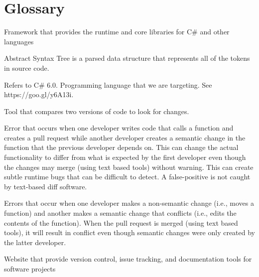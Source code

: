 \documentclass[draftclsnofoot,onecolumn]{IEEEtran}
\begin{document}
\section{Glossary}%

\begin{description} 

\item[.NET:] Framework that provides the runtime and core libraries for C\# 
and other languages

\item[AST:] Abstract Syntax Tree is a parsed data structure that represents 
all of the tokens in source code.

\item[C\#:] Refers to C\# 6.0. Programming language that we are targeting. 
See https://goo.gl/y6A13i.

\item[Diff:] Tool that compares two versions of code to look for changes.

\item[False-Positive:] Error that occurs when one developer writes code that 
calls a function and creates a pull request while another developer creates a 
semantic change in the function that the previous developer depends on. This 
can change the actual functionality to differ from what is expected by the 
first developer even though the changes may merge (using text based tools) 
without warning. This can create subtle runtime bugs that can be difficult to 
detect. A false-positive is not caught by text-based diff software.

\item[False-Negative:] Errors that occur when one developer makes a 
non-semantic change (i.e., moves a function) and another makes a semantic 
change that conflicts (i.e., edits the contents of the function). When the 
pull request is merged (using text based tools), it will result in conflict 
even though semantic changes were only created by the latter developer.

\item[GitHub:] Website that provide version control, issue tracking, and 
documentation tools for software projects


\end{description}
\end{document}
